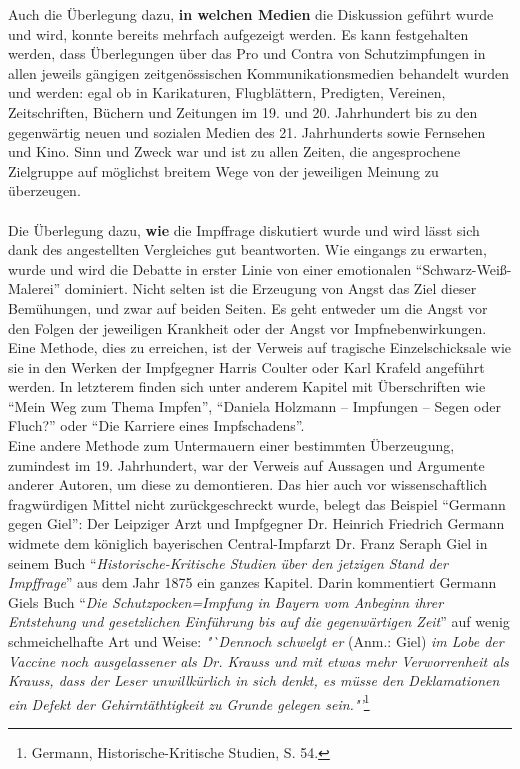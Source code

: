 \documentclass[
    a4paper,
    12pt,
    hyphens,
    chapterprefix=true,
    headheight=33pt,
    footheight=29pt,
    headings=optiontohead,
]{scrartcl}
\begin{document}
{\newpage
Auch die Überlegung dazu, \textbf{in welchen Medien} die Diskussion geführt wurde und wird, konnte bereits mehrfach aufgezeigt werden. Es kann festgehalten werden, dass Überlegungen über das Pro und Contra von Schutzimpfungen in allen jeweils gängigen zeitgenössischen Kommunikationsmedien behandelt wurden und werden: egal ob in Karikaturen, Flugblättern, Predigten, Vereinen, Zeitschriften, Büchern und Zeitungen im 19. und 20. Jahrhundert bis zu den gegenwärtig neuen und sozialen Medien des 21. Jahrhunderts sowie Fernsehen und Kino. Sinn und Zweck war und ist zu allen Zeiten, die angesprochene Zielgruppe auf möglichst breitem Wege von der jeweiligen Meinung zu überzeugen.\\
\\
Die Überlegung dazu, \textbf{wie} die Impffrage diskutiert wurde und wird lässt sich dank des angestellten Vergleiches gut beantworten. Wie eingangs zu erwarten, wurde und wird die Debatte in erster Linie von einer emotionalen "`Schwarz-Weiß-Malerei"' dominiert. Nicht selten ist die Erzeugung von Angst das Ziel dieser Bemühungen, und zwar auf beiden Seiten. Es geht entweder um die Angst vor den Folgen der jeweiligen Krankheit oder der Angst vor Impfnebenwirkungen. Eine Methode, dies zu erreichen, ist der Verweis auf tragische Einzelschicksale wie sie in den Werken der Impfgegner Harris Coulter oder Karl Krafeld angeführt werden. In letzterem finden sich unter anderem Kapitel mit Überschriften wie "`Mein Weg zum Thema Impfen"', "`Daniela Holzmann -- Impfungen -- Segen oder Fluch?"' oder "`Die Karriere eines Impfschadens"'. \\
Eine andere Methode zum Untermauern einer bestimmten Überzeugung, zumindest im 19. Jahrhundert, war der Verweis auf Aussagen und Argumente anderer Autoren, um diese zu demontieren. Das hier auch vor wissenschaftlich fragwürdigen Mittel nicht zurückgeschreckt wurde, belegt das Beispiel "`Germann gegen Giel"': Der Leipziger Arzt und Impfgegner Dr. Heinrich Friedrich Germann widmete dem königlich bayerischen Central-Impfarzt Dr. Franz Seraph Giel in seinem Buch "`\textit{Historische-Kritische Studien über den jetzigen Stand der Impffrage}"' aus dem Jahr 1875 ein ganzes Kapitel. Darin kommentiert Germann Giels Buch "`\textit{Die Schutzpocken=Impfung in Bayern vom Anbeginn ihrer Entstehung und gesetzlichen Einführung bis auf die gegenwärtigen Zeit}"' auf wenig schmeichelhafte Art und Weise: \textit{"`Dennoch schwelgt er} (Anm.: Giel) \textit{im Lobe der Vaccine noch ausgelassener als Dr. Krauss und mit etwas mehr Verworrenheit als Krauss, dass der Leser unwillkürlich in sich denkt, es müsse den Deklamationen ein Defekt der Gehirntäthtigkeit zu Grunde gelegen sein."'}\footnote{Germann, Historische-Kritische Studien, S. 54.}\\
}
\end{document}
